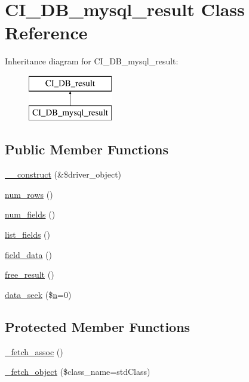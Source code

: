 \hypertarget{class_c_i___d_b__mysql__result}{}\section{C\+I\+\_\+\+D\+B\+\_\+mysql\+\_\+result Class Reference}
\label{class_c_i___d_b__mysql__result}
Inheritance diagram for C\+I\+\_\+\+D\+B\+\_\+mysql\+\_\+result\+:\begin{figure}[H]
\begin{center}
\leavevmode
\includegraphics[height=2.000000cm]{class_c_i___d_b__mysql__result}
\end{center}
\end{figure}
\subsection*{Public Member Functions}
\begin{DoxyCompactItemize}
\item 
\mbox{\hyperlink{class_c_i___d_b__mysql__result_a8e093c8b6e5733bc3f306385ee426ab7}{\+\_\+\+\_\+construct}} (\&\$driver\+\_\+object)
\item 
\mbox{\hyperlink{class_c_i___d_b__mysql__result_a218657c303ee499b97710ab0cd2f5d6e}{num\+\_\+rows}} ()
\item 
\mbox{\hyperlink{class_c_i___d_b__mysql__result_af831bf363e4d7d661a717a4932af449d}{num\+\_\+fields}} ()
\item 
\mbox{\hyperlink{class_c_i___d_b__mysql__result_a50b54eb4ea7cfd039740f532988ea776}{list\+\_\+fields}} ()
\item 
\mbox{\hyperlink{class_c_i___d_b__mysql__result_a84bffd65e53902ade1591716749a33e3}{field\+\_\+data}} ()
\item 
\mbox{\hyperlink{class_c_i___d_b__mysql__result_aad2d98d6beb3d6095405356c6107b473}{free\+\_\+result}} ()
\item 
\mbox{\hyperlink{class_c_i___d_b__mysql__result_a8255ae91816e4206e29eb7581c5af0f1}{data\+\_\+seek}} (\$\mbox{\hyperlink{cli_2error__php_8php_a2e6b16bbc42094e4c51ade3c10afdcf1}{n}}=0)
\end{DoxyCompactItemize}
\subsection*{Protected Member Functions}
\begin{DoxyCompactItemize}
\item 
\mbox{\hyperlink{class_c_i___d_b__mysql__result_a43a9a92817f1334a1c10752ec44275a0}{\+\_\+fetch\+\_\+assoc}} ()
\item 
\mbox{\hyperlink{class_c_i___d_b__mysql__result_a60806be6a9c2488820813c2a7f4fef71}{\+\_\+fetch\+\_\+object}} (\$class\+\_\+name=\textquotesingle{}std\+Class\textquotesingle{})
\end{DoxyCompactItemize}
